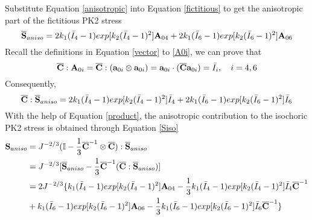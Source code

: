 Substitute Equation \ref{anisotropic} into Equation \ref{fictitious} to get the anisotropic part of the fictitious PK2 stress
\begin{equation} \label{HGOfictitious}
\overline{\bold{S}}_{aniso} = 2k_1{(\bar{I}_4-1)}exp[k_2(\bar{I}_4 - 1)^2]\bold{A}_{04} + 2k_1{(\bar{I}_6-1)}exp[k_2(\bar{I}_6 - 1)^2]\bold{A}_{06}
\end{equation}
Recall the definitions in Equation \ref{vector} to \ref{A0i}, we can prove that
\begin{equation}
\overline{\bold{C}} : \bold{A}_{0i} = \overline{\bold{C}} : (\bold{a}_{0i} \otimes \bold{a}_{0i}) = \bold{a}_{0i} \cdot (\overline{\bold{C}} \bold{a}_{0i}) = \bar{I}_i, \quad i = 4, 6
\end{equation}
Consequently, 
\begin{equation} \label{product}
\overline{\bold{C}} : \overline{\bold{S}}_{aniso} = 2k_1{(\bar{I}_4-1)}exp[k_2(\bar{I}_4 - 1)^2]\bar{I}_4 + 2k_1{(\bar{I}_6-1)}exp[k_2(\bar{I}_6 - 1)^2]\bar{I}_6
\end{equation}
With the help of Equation \ref{product}, the anisotropic contribution to the isochoric PK2 stress is obtained through Equation \ref{Siso}
\begin{equation} \label{HGOaniso}
\begin{split}
\bold{S}_{aniso} &= J^{-2/3}(\mathbb{I} - \frac{1}{3}{\overline{\bold{C}}}^{-1} \otimes \overline{\bold{C}}) : \overline{\bold{S}}_{aniso} \\
&= J^{-2/3}[\overline{\bold{S}}_{aniso} - \frac{1}{3}\overline{\bold{C}}^{-1}(\overline{\bold{C}} : \overline{\bold{S}}_{aniso})] \\
&= 2J^{-2/3} \{k_1{(\bar{I}_4-1)}exp[k_2(\bar{I}_4 - 1)^2]\bold{A}_{04} - \frac{1}{3}k_1{(\bar{I}_4-1)}exp[k_2(\bar{I}_4 - 1)^2]\bar{I}_4\overline{\bold{C}}^{-1} \\
&+ 
k_1{(\bar{I}_6-1)}exp[k_2(\bar{I}_6 - 1)^2]\bold{A}_{06} - \frac{1}{3}k_1{(\bar{I}_6-1)}exp[k_2(\bar{I}_6 - 1)^2]\bar{I}_6\overline{\bold{C}}^{-1}\}
\end{split}
\end{equation}

